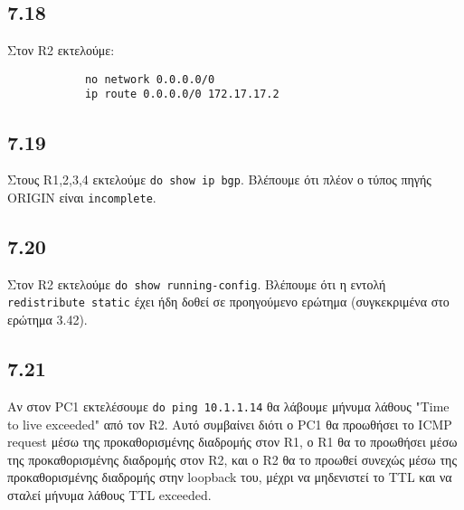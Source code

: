 \documentclass[a4paper, 12pt]{article}
\begin{document}
	\subsection*{7.18}
		Στον R2 εκτελούμε:
		
		\begin{verbatim}
			no network 0.0.0.0/0
			ip route 0.0.0.0/0 172.17.17.2
		\end{verbatim}

	\subsection*{7.19}
		Στους R1,2,3,4 εκτελούμε \verb|do show ip bgp|. Βλέπουμε ότι πλέον ο τύπος πηγής ORIGIN είναι \verb|incomplete|.

	\subsection*{7.20}
		Στον R2 εκτελούμε \verb|do show running-config|. Βλέπουμε ότι η εντολή \verb|redistribute static| έχει ήδη δοθεί σε προηγούμενο ερώτημα (συγκεκριμένα στο ερώτημα 3.42).

	\subsection*{7.21}
		Αν στον PC1 εκτελέσουμε \verb|do ping 10.1.1.14| θα λάβουμε μήνυμα λάθους "Time to live exceeded" από τον R2. Αυτό συμβαίνει διότι ο PC1 θα προωθήσει το ICMP request μέσω της προκαθορισμένης διαδρομής στον R1, ο R1 θα το προωθήσει μέσω της προκαθορισμένης διαδρομής στον R2, και ο R2 θα το προωθεί συνεχώς μέσω της προκαθορισμένης διαδρομής στην loopback του, μέχρι να μηδενιστεί το TTL και να σταλεί μήνυμα λάθους TTL exceeded.
\end{document}
